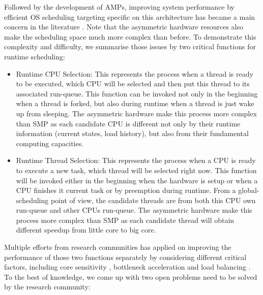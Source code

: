 \documentclass[pageno]{jpaper}
\begin{document}
Followed by the development of AMPs, improving system performance by efficient OS scheduling targeting specific on this architecture has became a main concern in the literature \cite{mittal2016survey}. Note that the asymmetric hardware resources also make the scheduling space much more complex than before. To demonstrate this complexity and difficulty, we summarise those issues by two critical functions for runtime scheduling:

\begin{itemize}
\item Runtime CPU Selection: This represents the process when a thread is ready to be executed, which CPU will be selected and then put this thread to its associated run-queue. This function can be invoked not only in the beginning when a thread is forked, but also during runtime when a thread is just wake up from sleeping. The asymmetric hardware make this process more complex than SMP as each candidate CPU is different not only by their runtime information (current states, load history), but also from their fundamental computing capacities.  
\item Runtime Thread Selection: This represents the process when a CPU is ready to execute a new task, which thread will be selected right now. This function will be invoked either in the beginning when the hardware is setup or when a CPU finishes it current task or by preemption during runtime. From a global-scheduling\cite{jeff2013big} point of view, the candidate threads are from both this CPU own run-queue and other CPUs run-queue. The asymmetric hardware make this process more complex than SMP as each candidate thread will obtain different speedup from little core to big core. 
\end{itemize}


Multiple efforts from research communities has applied on improving the performance of those two functions separately by considering different critical factors, including core sensitivity \cite{jibaja2016portable,cao2012yin}, bottleneck acceleration \cite{han2018multicore,joao2013utility,joao2012bottleneck,suleman2009accelerating}
and load balancing \cite{kim2018exploring,wang2016rebudget,van2013fairness,van2012scheduling}. To the best of knowledge, we come up with two open problems need to be solved by the research community:
\end{document}
